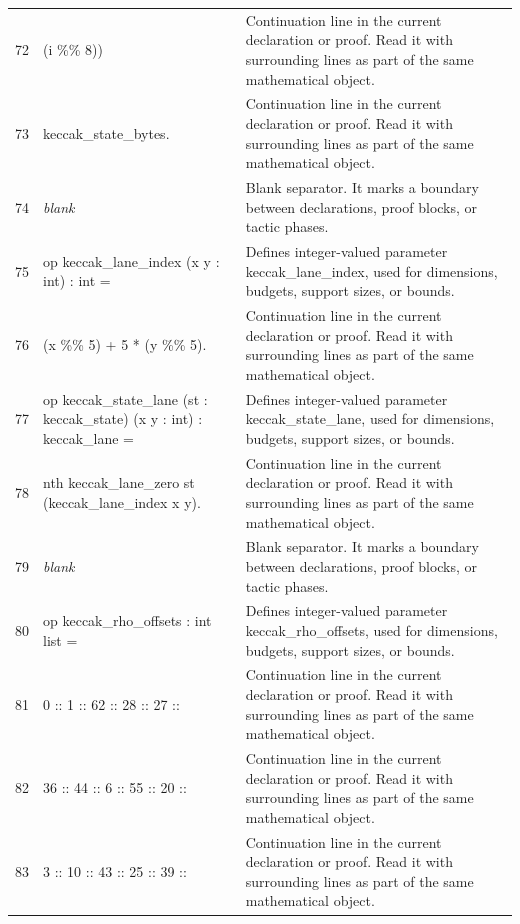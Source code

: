 \documentclass[10pt]{article}
\begin{document}
\begin{longtable}{r L{0.53\textwidth} L{0.37\textwidth}}
72 & {\ttfamily\scriptsize          (i \%\% 8))} & Continuation line in the current declaration or proof.  Read it with surrounding lines as part of the same mathematical object. \\
73 & {\ttfamily\scriptsize     keccak\_state\_bytes.} & Continuation line in the current declaration or proof.  Read it with surrounding lines as part of the same mathematical object. \\
74 & {\ttfamily\scriptsize \emph{blank}} & Blank separator.  It marks a boundary between declarations, proof blocks, or tactic phases. \\
75 & {\ttfamily\scriptsize op keccak\_lane\_index (x y : int) : int =} & Defines integer-valued parameter keccak\_lane\_index, used for dimensions, budgets, support sizes, or bounds. \\
76 & {\ttfamily\scriptsize   (x \%\% 5) + 5 * (y \%\% 5).} & Continuation line in the current declaration or proof.  Read it with surrounding lines as part of the same mathematical object. \\
77 & {\ttfamily\scriptsize op keccak\_state\_lane (st : keccak\_state) (x y : int) : keccak\_lane =} & Defines integer-valued parameter keccak\_state\_lane, used for dimensions, budgets, support sizes, or bounds. \\
78 & {\ttfamily\scriptsize   nth keccak\_lane\_zero st (keccak\_lane\_index x y).} & Continuation line in the current declaration or proof.  Read it with surrounding lines as part of the same mathematical object. \\
79 & {\ttfamily\scriptsize \emph{blank}} & Blank separator.  It marks a boundary between declarations, proof blocks, or tactic phases. \\
80 & {\ttfamily\scriptsize op keccak\_rho\_offsets : int list =} & Defines integer-valued parameter keccak\_rho\_offsets, used for dimensions, budgets, support sizes, or bounds. \\
81 & {\ttfamily\scriptsize   0 :: 1 :: 62 :: 28 :: 27 ::} & Continuation line in the current declaration or proof.  Read it with surrounding lines as part of the same mathematical object. \\
82 & {\ttfamily\scriptsize   36 :: 44 :: 6 :: 55 :: 20 ::} & Continuation line in the current declaration or proof.  Read it with surrounding lines as part of the same mathematical object. \\
83 & {\ttfamily\scriptsize   3 :: 10 :: 43 :: 25 :: 39 ::} & Continuation line in the current declaration or proof.  Read it with surrounding lines as part of the same mathematical object. \\

\end{longtable}
\end{document}
